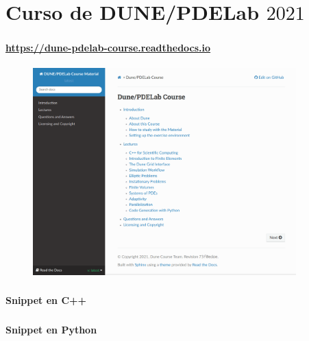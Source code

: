 \section{Curso de DUNE/PDELab $2021$}

\begin{frame}[fragile]
	\frametitle{\secname}
	\framesubtitle{\url{https://dune-pdelab-course.readthedocs.io}}

	\begin{figure}[ht!]
		\centering
		\includegraphics[height=8cm]{dune_course_2021}
	\end{figure}
\end{frame}

\begin{frame}[fragile]
	\frametitle{\secname}
	\framesubtitle{Snippet en C++}
	
\end{frame}

\begin{frame}[fragile]
	\frametitle{\secname}
	\framesubtitle{Snippet en Python}
	
\end{frame}

{
\begin{frame}[plain]
\end{frame}
}

